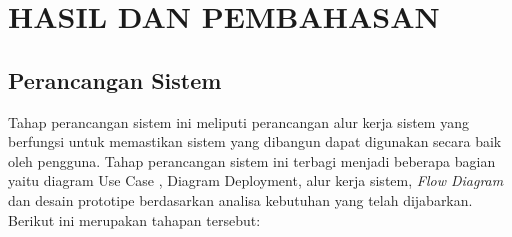 \fancyhf{} 
 \fancyfoot[C]{\thepage}
\chapter{HASIL DAN PEMBAHASAN}


\section{Perancangan Sistem}

Tahap perancangan sistem ini meliputi perancangan alur kerja sistem yang berfungsi untuk memastikan sistem yang dibangun dapat digunakan secara baik oleh pengguna. Tahap perancangan sistem ini terbagi menjadi beberapa bagian yaitu diagram Use Case , Diagram Deployment, alur kerja sistem, \textit{Flow Diagram} dan desain prototipe berdasarkan analisa kebutuhan yang telah dijabarkan. Berikut ini merupakan tahapan tersebut:



